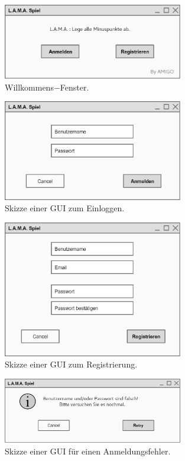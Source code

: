 \begin{figure}[h]
	\centering
	\includegraphics[width=0.7\textwidth]{img/willkommen}
	\caption{Willkommens$-$Fenster.}
	\label{gui:willkommen}
\end{figure}
\begin{figure}
	\centering
	\includegraphics[width=0.7\textwidth]{img/Anmelden}
	\caption{Skizze einer GUI zum Einloggen.}
	\label{gui:login}
\end{figure}
\begin{figure}
	\centering
	\includegraphics[width=0.7\textwidth]{img/registrieren}
	\caption{Skizze einer GUI zum Registrierung.}
	\label{gui:register}
\end{figure}
\begin{figure}
	\centering
	\includegraphics[width=0.7\textwidth]{img/falschername}
	\caption{Skizze einer GUI für einen Anmeldungsfehler.}
	\label{gui:warning1}
\end{figure}
